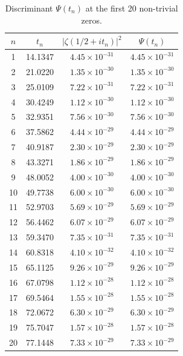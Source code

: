 \documentclass[12pt,a4paper]{article}
\begin{document}
\begin{table}[H]
\centering
\caption{Discriminant \(\Psi(t_n)\) at the first 20 non-trivial zeros.}
\label{tab:zeros20}
\begin{tabular}{cccc}
\toprule
\(n\) & \(t_n\) & \(|\zeta(1/2+it_n)|^2\) & \(\Psi(t_n)\) \\
\midrule
1 & 14.1347 & \(4.45\times10^{-31}\) & \(4.45\times10^{-31}\) \\
2 & 21.0220 & \(1.35\times10^{-30}\) & \(1.35\times10^{-30}\) \\
3 & 25.0109 & \(7.22\times10^{-31}\) & \(7.22\times10^{-31}\) \\
4 & 30.4249 & \(1.12\times10^{-30}\) & \(1.12\times10^{-30}\) \\
5 & 32.9351 & \(7.56\times10^{-30}\) & \(7.56\times10^{-30}\) \\
6 & 37.5862 & \(4.44\times10^{-29}\) & \(4.44\times10^{-29}\) \\
7 & 40.9187 & \(2.30\times10^{-29}\) & \(2.30\times10^{-29}\) \\
8 & 43.3271 & \(1.86\times10^{-29}\) & \(1.86\times10^{-29}\) \\
9 & 48.0052 & \(4.00\times10^{-30}\) & \(4.00\times10^{-30}\) \\
10 & 49.7738 & \(6.00\times10^{-30}\) & \(6.00\times10^{-30}\) \\
11 & 52.9703 & \(5.69\times10^{-29}\) & \(5.69\times10^{-29}\) \\
12 & 56.4462 & \(6.07\times10^{-29}\) & \(6.07\times10^{-29}\) \\
13 & 59.3470 & \(7.35\times10^{-31}\) & \(7.35\times10^{-31}\) \\
14 & 60.8318 & \(4.10\times10^{-32}\) & \(4.10\times10^{-32}\) \\
15 & 65.1125 & \(9.26\times10^{-29}\) & \(9.26\times10^{-29}\) \\
16 & 67.0798 & \(1.12\times10^{-28}\) & \(1.12\times10^{-28}\) \\
17 & 69.5464 & \(1.55\times10^{-28}\) & \(1.55\times10^{-28}\) \\
18 & 72.0672 & \(6.30\times10^{-29}\) & \(6.30\times10^{-29}\) \\
19 & 75.7047 & \(1.57\times10^{-28}\) & \(1.57\times10^{-28}\) \\
20 & 77.1448 & \(7.33\times10^{-29}\) & \(7.33\times10^{-29}\) \\
\bottomrule
\end{tabular}
\end{table}
\end{document}
